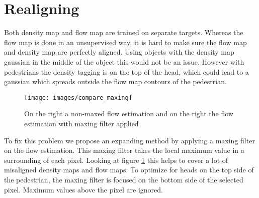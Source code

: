 %
%
%


\section{Realigning}
Both density map and flow map are trained on separate targets. Whereas the flow map is done in an unsupervised way, it is hard to make sure the flow map and density map are perfectly aligned. Using objects with the density map gaussian in the middle of the object this would not be an issue. However with pedestrians the density tagging is on the top of the head, which could lead to a gaussian which spreads outside the flow map contours of the pedestrian.

\begin{figure}[h]
\centering
\texttt{[image: images/compare\_maxing]}
\caption{On the right a non-maxed flow estimation and on the right the flow estimation with maxing filter applied}
\label{fig:maxing}
\end{figure}

To fix this problem we propose an expanding method by applying a maxing filter on the flow estimation. This maxing filter takes the local maximum value in a surrounding of each pixel. Looking at figure \ref{fig:maxing} this helps to cover a lot of misaligned density maps and flow maps. To optimize for heads on the top side of the pedestrian, the maxing filter is focused on the bottom side of the selected pixel. Maximum values above the pixel are ignored.


